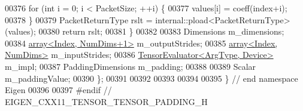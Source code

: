\begin{DoxyCode}
00376     \textcolor{keywordflow}{for} (\textcolor{keywordtype}{int} i = 0; i < PacketSize; ++i) \{
00377       values[i] = coeff(index+i);
00378     \}
00379     PacketReturnType rslt = internal::pload<PacketReturnType>(values);
00380     \textcolor{keywordflow}{return} rslt;
00381   \}
00382 
00383   Dimensions m\_dimensions;
00384   \hyperlink{class_eigen_1_1array}{array<Index, NumDims+1>} m\_outputStrides;
00385   \hyperlink{class_eigen_1_1array}{array<Index, NumDims>} m\_inputStrides;
00386   \hyperlink{struct_eigen_1_1_tensor_evaluator}{TensorEvaluator<ArgType, Device>} m\_impl;
00387   PaddingDimensions m\_padding;
00388 
00389   Scalar m\_paddingValue;
00390 \};
00391 
00392 
00393 
00394 
00395 \} \textcolor{comment}{// end namespace Eigen}
00396 
00397 \textcolor{preprocessor}{#endif // EIGEN\_CXX11\_TENSOR\_TENSOR\_PADDING\_H}
\end{DoxyCode}
